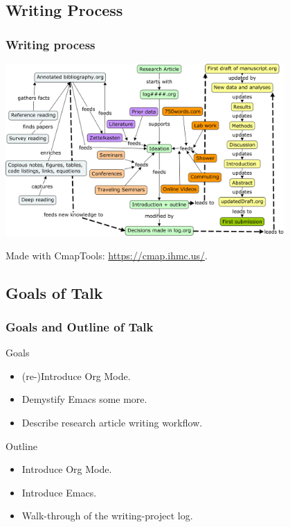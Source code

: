 \documentclass[aspectratio=169]{beamer}
\begin{document}
\subsection{Writing Process}
\begin{frame}
\frametitle{Writing process}
\begin{center}
    \includegraphics[width=0.8\textwidth, angle=0]{./Figures/writingProcessUpdated}
\end{center}
Made with CmapTools: \url{https://cmap.ihmc.us/}.
\end{frame}
\note{ 
}

\subsection{Goals of Talk}
\begin{frame}
\frametitle{Goals and Outline of Talk}
\Large{
Goals
\begin{itemize}[font=$\bullet$\scshape\bfseries]
\item (re-)Introduce Org Mode.
\item Demystify Emacs some more.
\item Describe research article writing workflow.
\end{itemize}
Outline
\begin{itemize}[font=$\bullet$\scshape\bfseries]
\item Introduce Org Mode. 
\item Introduce Emacs.
\item Walk-through of the writing-project log.
\end{itemize}
}
\end{frame}



\end{document}
